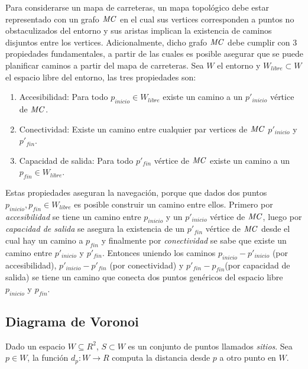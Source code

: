 Para considerarse un mapa de carreteras, un mapa topológico debe estar representado con un grafo $\mathit{MC}$ en el cual sus vertices corresponden a puntos no obstaculizados del entorno y sus aristas implican la existencia de caminos disjuntos entre los vertices. Adicionalmente, dicho grafo $\mathit{MC}$ debe cumplir con 3 propiedades fundamentales, a partir de las cuales es posible asegurar que se puede planificar caminos a partir del mapa de carreteras. Sea $W$ el entorno y $W_{libre} \subset W$ el espacio libre del entorno, las tres propiedades son:

\begin{enumerate}
  \item Accesibilidad: Para todo $p_{inicio} \in W_{libre}$ existe un camino a un $p'_{inicio}$ vértice de $\mathit{MC}$.
  \item Conectividad: Existe un camino entre cualquier par vertices de $\mathit{MC}$ $p'_{inicio}$ y $p'_{fin}$.
  \item Capacidad de salida: Para todo $p'_{fin}$ vértice de $\mathit{MC}$ existe un camino a un $p_{fin} \in W_{libre}$.
\end{enumerate}

Estas propiedades aseguran la navegación, porque que dados dos puntos $p_{inicio},p_{fin}\in W_{libre}$ es posible construir un camino entre ellos. Primero por \emph{accesibilidad} se tiene un camino entre $p_{inicio}$ y un $p'_{inicio}$ vértice de $\mathit{MC}$, luego por \emph{capacidad de salida} se asegura la existencia de un  $p'_{fin}$ vértice de $\mathit{MC}$ desde el cual hay un camino a $p_{fin}$ y finalmente por \emph{conectividad} se sabe que existe un camino entre $p'_{inicio}$ y $p'_{fin}$. Entonces uniendo los caminos $p_{inicio} - p'_{inicio}$ (por accesibilidad), $p'_{inicio} - p'_{fin}$ (por conectividad) y $p'_{fin} - p_{fin}$(por capacidad de salida) se tiene un camino que conecta dos puntos genéricos del espacio libre $p_{inicio}$ y $p_{fin}$.

\subsection{Diagrama de Voronoi}\label{sec:DV}
Dado un espacio $W \subseteq R^2$, $S \subset W$ es un conjunto de puntos llamados \emph{sitios}. Sea $p\in W$, la función $d_p : W \rightarrow R$ computa la distancia desde $p$ a otro punto  en $W$. 

